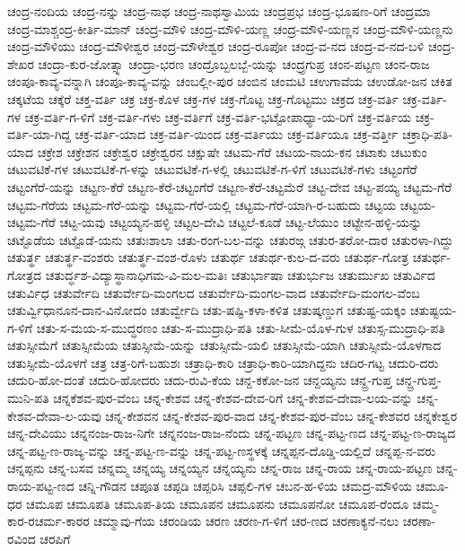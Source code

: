 ಚಂದ್ರ-ನಂದಿಯ
ಚಂದ್ರ-ನನ್ನು
ಚಂದ್ರ-ನಾಥ
ಚಂದ್ರ-ನಾಥಸ್ವಾಮಿಯ
ಚಂದ್ರಪ್ರಭ
ಚಂದ್ರ-ಭೂಷಣ-ರಿಗೆ
ಚಂದ್ರಮಾ
ಚಂದ್ರ-ಮಾಶ್ಚಂದ್ರ-ಕೀರ್ತಿ-ಮಾನ್
ಚಂದ್ರ-ಮೌಳಿ
ಚಂದ್ರ-ಮೌಳಿ-ಯಣ್ಣ
ಚಂದ್ರ-ಮೌಳಿ-ಯಣ್ಣನ
ಚಂದ್ರ-ಮೌಳಿ-ಯಣ್ಣನು
ಚಂದ್ರ-ಮೌಳಿಯು
ಚಂದ್ರ-ಮೌಳೀಶ್ವರ
ಚಂದ್ರ-ಮೌಳೇಶ್ವರ
ಚಂದ್ರ-ರೂಪೋ
ಚಂದ್ರ-ವ-ನದ
ಚಂದ್ರ-ವ-ನದ-ಬಳಿ
ಚಂದ್ರ-ಶೇಖರ
ಚಂದ್ರಾ-ಕುರ-ಜೋತ್ಸ್ನಾ
ಚಂದ್ರಾ-ಭರಣ
ಚಂದ್ರೊಬ್ಬಲಬ್ಬೆ-ಯನ್ನು
ಚಂದ್ರ್ರಗುಪ್ರ
ಚಂನ-ಪಟ್ಟಣ
ಚಂನ-ರಾಜ
ಚಂಪೂ-ಕಾವ್ಯ-ವನ್ನಾಗಿ
ಚಂಪೂ-ಕಾವ್ಯ-ವನ್ನು
ಚಂಬಲ್ಲೀ-ಪುರ
ಚಂಬಿನ
ಚಂಮಟಿ
ಚಉಗಾವೆಯ
ಚಉಡೋ-ಜನ
ಚಕಿತ
ಚಕ್ಕಟೆಯ
ಚಕ್ಕೆರೆ
ಚಕ್ತ-ವರ್ತಿ
ಚಕ್ರ
ಚಕ್ರ-ಕೊಳ
ಚಕ್ರ-ಗಳ
ಚಕ್ರ-ಗೊಟ್ಟ
ಚಕ್ರ-ಗೊಟ್ಟಮು
ಚಕ್ರದ
ಚಕ್ರ-ವರ್ತಿ
ಚಕ್ರ-ವರ್ತಿ-ಗಳ
ಚಕ್ರ-ವರ್ತಿ-ಗ-ಳಿಗೆ
ಚಕ್ರ-ವರ್ತಿ-ಗಳು
ಚಕ್ರ-ವರ್ತಿಗೆ
ಚಕ್ರ-ವರ್ತಿ-ಭಟ್ಟೋಪಾಧ್ಯಾ-ಯ-ರಿಗೆ
ಚಕ್ರ-ವರ್ತಿಯ
ಚಕ್ರ-ವರ್ತಿ-ಯಾ-ಗಿದ್ದ
ಚಕ್ರ-ವರ್ತಿ-ಯಾದ
ಚಕ್ರ-ವರ್ತಿ-ಯಿಂದ
ಚಕ್ರ-ವರ್ತಿಯು
ಚಕ್ರ-ವರ್ತಿಯೂ
ಚಕ್ರ-ವರ್ತ್ತೀ
ಚಕ್ರಾಧಿ-ಪತಿ-ಯಾದ
ಚಕ್ರೇಶ
ಚಕ್ರೇಶನ
ಚಕ್ರೇಶ್ವರ
ಚಕ್ರೇಶ್ವರನ
ಚಕ್ಷುಷೇ
ಚಟಮ-ಗೆರೆ
ಚಟಯ-ನಾಯ-ಕನ
ಚಟಾಕು
ಚಟುಕುಂ
ಚಟುವಟಿಕೆ-ಗಳ
ಚಟುವಟಿಕೆ-ಗ-ಳನ್ನು
ಚಟುವಟಿಕೆ-ಗ-ಳಲ್ಲಿ
ಚಟುವಟಿಕೆ-ಗ-ಳಿಗೆ
ಚಟುವಟಿಕೆ-ಗಳು
ಚಟ್ಟಂಗೆರೆ
ಚಟ್ಟಂಗೆರೆ-ಯನ್ನು
ಚಟ್ಟಣ-ಕೆರೆ
ಚಟ್ಟಣ-ಕೆರೆ-ಚಟ್ಟಂಗೆರೆ
ಚಟ್ಟಣ-ಕೆರೆ-ಚಟ್ಟಮೆರೆ
ಚಟ್ಟ-ದೇವ
ಚಟ್ಟ-ಪಯ್ಯ
ಚಟ್ಟಮ-ಗೆರೆ
ಚಟ್ಟಮ-ಗೆರೆಯ
ಚಟ್ಟಮ-ಗೆರೆ-ಯನ್ನು
ಚಟ್ಟಮ-ಗೆರೆ-ಯಲ್ಲಿ
ಚಟ್ಟಮ-ಗೆರೆ-ಯಾಗಿ-ರ-ಬಹುದು
ಚಟ್ಟಯ
ಚಟ್ಟಯ-ಚಟ್ಟಮ-ಗೆರೆ
ಚಟ್ಟ-ಯವು
ಚಟ್ಟಯ್ಯನ-ಹಳ್ಳಿ
ಚಟ್ಟಲ-ದೇವಿ
ಚಟ್ಟಲೆ-ಕೂಡೆ
ಚಟ್ಟ-ಲೆಯುಂ
ಚಟ್ಟೇನ-ಹಳ್ಳಿ-ಯನ್ನು
ಚಟ್ಟೊಡೆಯ
ಚಟ್ಟೊಡೆ-ಯನು
ಚತುಃಶಾಲಾ
ಚತು-ರಂಗ-ಬಲ-ವನ್ನು
ಚತುರಙ್ಗ
ಚತುರ-ತರೋ-ದಾರ
ಚತುರಳಾ-ಗಿದ್ದು
ಚತುರ್ತ್ಥ
ಚತುರ್ತ್ಥ-ವಂಶರು
ಚತುರ್ತ್ಥ-ವಂಶ-ರೊಳು
ಚತುರ್ಥ
ಚತುರ್ಥ-ಕುಲ-ದ-ವರು
ಚತುರ್ಥ-ಗೋತ್ರ
ಚತುರ್ಥ-ಗೋತ್ರದ
ಚತುರ್ದ್ಧಶ-ವಿದ್ಯಾಸ್ಥಾನಾಧಿಗಮ-ವಿ-ಮಲ-ಮತಿಃ
ಚತುರ್ಭಾಷಾ
ಚತುರ್ಭುಜ
ಚತುರ್ಮುಖ
ಚತುರ್ವಿದ
ಚತುರ್ವಿಧ
ಚತುರ್ವೇದಿ
ಚತುರ್ವೇದಿ-ಮಂಗಲದ
ಚತುರ್ವೇದಿ-ಮಂಗಲ-ವಾದ
ಚತುರ್ವೇದಿ-ಮಂಗಲ-ವೆಂಬ
ಚತುರ್ವ್ವಿಧಾನೂನ-ದಾನ-ವಿನೋದಂ
ಚತುರ್ವ್ವೇದಿ
ಚತು-ಷಷ್ಟಿ-ಕಳಾ-ಕಳಿತ
ಚತುಷ್ಕಣ್ಡುಗ
ಚತುಷ್ಟ-ಯಕ್ಕಂ
ಚತುಷ್ಟಯ-ಗ-ಳಿಗೆ
ಚತು-ಸ-ಮಯ-ಸ-ಮುದ್ಧರಣಂ
ಚತು-ಸ-ಮುದ್ರಾಧಿ-ಪತಿ
ಚತು-ಸೀಮೆ-ಯೊಳ-ಗುಳ
ಚತುಸ್ಸ-ಮುದ್ರಾಧಿ-ಪತಿ
ಚತುಸ್ಸೀಮೆಗೆ
ಚತುಸ್ಸೀಮೆಯ
ಚತುಸ್ಸೀಮೆ-ಯನ್ನು
ಚತುಸ್ಸೀಮೆ-ಯಲಿ
ಚತುಸ್ಸೀಮೆ-ಯಾಗಿ
ಚತುಸ್ಸೀಮೆ-ಯೊಳಗಾದ
ಚತುಸ್ಸೀಮೆ-ಯೊಳಗೆ
ಚತ್ರ
ಚತ್ರ-ರಿಗೆ-ಬಹುಶಃ
ಚತ್ರಾಧಿ-ಕಾರಿ
ಚತ್ರಾಧಿ-ಕಾರಿ-ಯಾಗಿದ್ದನು
ಚದಿರ-ಗಟ್ಟ
ಚದುರಿ-ದರು
ಚದುರಿ-ಹೋ-ದಂತೆ
ಚದುರಿ-ಹೋದರು
ಚದು-ರುವಿ-ಕೆಯ
ಚನ್ದ-ಕಕೋ-ಜನ
ಚನ್ದಯ್ಯನು
ಚನ್ದ್ರ-ಗುಪ್ತ
ಚನ್ದ್ರ-ಗುಪ್ತ-ಮುನಿ-ಪತಿ
ಚನ್ನಕೆಶವ-ಪುರ-ವೆಂಬ
ಚನ್ನ-ಕೇಶವ
ಚನ್ನ-ಕೇಶವ-ದೇವ-ರಿಗೆ
ಚನ್ನ-ಕೇಶವ-ದೇವಾ-ಲಯ-ವನ್ನು
ಚನ್ನ-ಕೇಶವ-ದೇವಾ-ಲ-ಯವು
ಚನ್ನ-ಕೇಶವನ
ಚನ್ನ-ಕೇಶವ-ಪುರ-ವಾದ
ಚನ್ನ-ಕೇಶವ-ಪುರ-ವೆಂಬ
ಚನ್ನ-ಕೇಶವರ
ಚನ್ನಕೇಶ್ವರ
ಚನ್ನ-ದೇವಿಯು
ಚನ್ನನಂಜ-ರಾಜ-ನಿಗೇ
ಚನ್ನನಂಜ-ರಾಜ-ನೆಂದು
ಚನ್ನ-ಪಟ್ಟಣ
ಚನ್ನ-ಪಟ್ಟ-ಣದ
ಚನ್ನ-ಪಟ್ಟ-ಣ-ರಾಜ್ಯದ
ಚನ್ನ-ಪಟ್ಟ-ಣ-ರಾಜ್ಯ-ವನ್ನು
ಚನ್ನ-ಪಟ್ಟ-ಣ-ವನ್ನು
ಚನ್ನ-ಪಟ್ಟ-ಣಸ್ಥಳಕ್ಕೆ
ಚನ್ನಪ್ಪನ-ದೊಡ್ಡಿ-ಯಲ್ಲಿದೆ
ಚನ್ನಪ್ಪ-ನ-ವರು
ಚನ್ನಪ್ಪನು
ಚನ್ನ-ಬಸವ
ಚನ್ನಮ್ಮ
ಚನ್ನಯ್ಯ
ಚನ್ನಯ್ಯನ
ಚನ್ನಯ್ಯನು
ಚನ್ನ-ರಾಜ
ಚನ್ನ-ರಾಯ
ಚನ್ನ-ರಾಯ-ಪಟ್ಟಣ
ಚನ್ನ-ರಾಯ-ಪಟ್ಟ-ಣದ
ಚನ್ನಿ-ಗೌಡನ
ಚಪೂತ
ಚಪ್ಪಡಿ
ಚಪ್ಪರಿಸಿ
ಚಪ್ಪಲಿ-ಗಳ
ಚಬನ-ಹ-ಳಿಯ
ಚಮದ್ರ-ಮೌಳಿಯ
ಚಮೂ-ಧರ
ಚಮೂಪ
ಚಮೂಪತಿ
ಚಮೂಪ-ತಿಯ
ಚಮೂಪನ
ಚಮೂಪನು
ಚಮೂಪನೋ
ಚಮೂಪ-ರೆಂದೂ
ಚಮ್ಮ-ಕಾರ-ರಚರ್ಮ-ಕಾರರ
ಚಮ್ಮಾವು-ಗೆಯ
ಚರಂಡಿಯ
ಚರಣ
ಚರಣ-ಗ-ಳಿಗೆ
ಚರ-ಣದ
ಚರಣಾಕ್ಯನೆ-ನಲು
ಚರಣಾ-ರವಿಂದ
ಚರಪಿಗೆ
